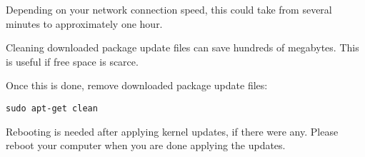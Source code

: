 Depending on your network connection speed, this could take from several minutes
to approximately one hour.

Cleaning downloaded package update files can save hundreds of megabytes. This is
useful if free space is scarce.

Once this is done, remove downloaded package update files:
\begin{verbatim}
sudo apt-get clean
\end{verbatim}

Rebooting is needed after applying kernel updates, if there were any.
Please reboot your computer when you are done applying the updates.

